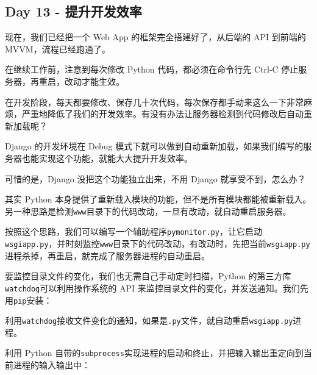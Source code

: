 \hypertarget{day-13---ux63d0ux5347ux5f00ux53d1ux6548ux7387}{%
\subsection{Day 13 -
提升开发效率}\label{day-13---ux63d0ux5347ux5f00ux53d1ux6548ux7387}}

现在，我们已经把一个 Web App 的框架完全搭建好了，从后端的 API 到前端的
MVVM，流程已经跑通了。

在继续工作前，注意到每次修改 Python 代码，都必须在命令行先 Ctrl-C
停止服务器，再重启，改动才能生效。

在开发阶段，每天都要修改、保存几十次代码，每次保存都手动来这么一下非常麻烦，严重地降低了我们的开发效率。有没有办法让服务器检测到代码修改后自动重新加载呢？

Django 的开发环境在 Debug
模式下就可以做到自动重新加载，如果我们编写的服务器也能实现这个功能，就能大大提升开发效率。

可惜的是，Django 没把这个功能独立出来，不用 Django 就享受不到，怎么办？

其实 Python
本身提供了重新载入模块的功能，但不是所有模块都能被重新载入。另一种思路是检测\texttt{www}目录下的代码改动，一旦有改动，就自动重启服务器。

按照这个思路，我们可以编写一个辅助程序\texttt{pymonitor.py}，让它启动\texttt{wsgiapp.py}，并时刻监控\texttt{www}目录下的代码改动，有改动时，先把当前\texttt{wsgiapp.py}进程杀掉，再重启，就完成了服务器进程的自动重启。

要监控目录文件的变化，我们也无需自己手动定时扫描，Python
的第三方库\texttt{watchdog}可以利用操作系统的 API
来监控目录文件的变化，并发送通知。我们先用\texttt{pip}安装：


利用\texttt{watchdog}接收文件变化的通知，如果是\texttt{.py}文件，就自动重启\texttt{wsgiapp.py}进程。

利用 Python
自带的\texttt{subprocess}实现进程的启动和终止，并把输入输出重定向到当前进程的输入输出中：

